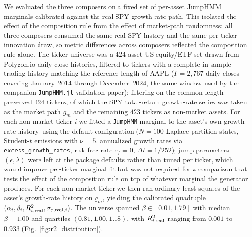 
We evaluated the three composers on a fixed set of per-asset JumpHMM
marginals calibrated against the real SPY growth-rate path. This
isolated the effect of the composition rule from the effect of
market-path randomness: all three composers consumed the same real SPY
history and the same per-ticker innovation draw, so metric differences
across composers reflected the composition rule alone. The ticker
universe was a $424$-asset US equity/ETF set drawn from Polygon.io
daily-close histories, filtered to tickers with a complete in-sample
trading history matching the reference length of AAPL
($T = 2{,}767$ daily closes covering January~2014 through
December~2024, the same window used by the companion
\texttt{JumpHMM.jl} validation paper); filtering on the common length
preserved $424$ tickers, of which the SPY total-return growth-rate
series was taken as the market path $g_m$ and the remaining $423$
tickers as non-market assets. For each non-market ticker $i$ we fitted
a \texttt{JumpHMM} marginal to the asset's own growth-rate history,
using the default configuration ($N = 100$ Laplace-partition states,
Student-$t$ emissions with $\nu = 5$, annualized growth rates via
\texttt{excess\_growth\_rates}, risk-free rate $r_f = 0$,
$\Delta t = 1/252$); jump parameters $(\epsilon, \lambda)$ were left at
the package defaults rather than tuned per ticker, which would improve
per-ticker marginal fit but was not required for a comparison that
tests the effect of the composition rule on top of whatever marginal
the generator produces. For each non-market ticker we then ran
ordinary least squares of the asset's growth-rate history on $g_m$,
yielding the calibrated quadruple
$(\alpha_i, \beta_i, R^2_{i,\mathrm{real}}, \sigma_{\varepsilon,\mathrm{real},i})$. The
universe spanned $\beta \in [0.01, 1.79]$ with median $\beta = 1.00$
and quartiles $(0.81, 1.00, 1.18)$, with $R^2_{i,\mathrm{real}}$ ranging
from $0.001$ to $0.933$ (Fig.~\ref{fig:r2_distribution}).

